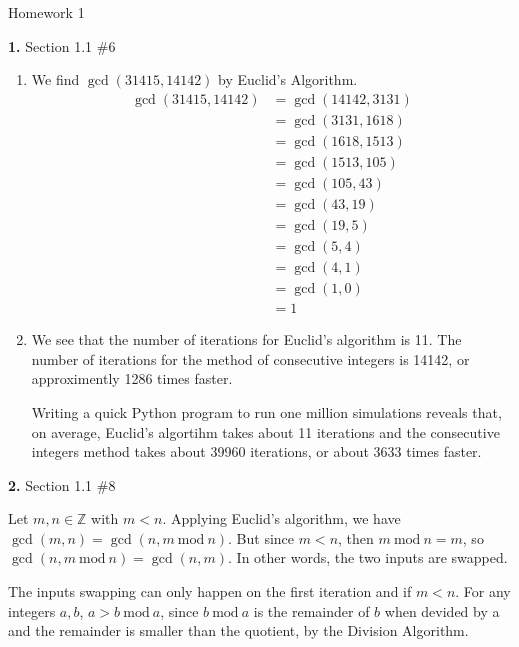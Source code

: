 \documentclass[letterpaper, 11pt]{article}
\newcommand{\Z}{\mathbb{Z}}
\newcommand{\hwnumber}[3]{\medskip \noindent\textbf{#1.} Section #2 \##3 \smallskip}
\newcommand{\Mod}[1]{\ \mathrm{mod}\ #1}
\begin{document}
\begin{center}
	{\LARGE Homework 1}\\
\end{center}

\hwnumber{1}{1.1}{6}

\begin{enumerate}[label = (\alph*)]
  \item We find $\gcd(31415, 14142)$ by Euclid's Algorithm.
    \begin{align*}
      \gcd(31415, 14142) &= \gcd(14142, 3131)\\
                         &= \gcd(3131, 1618)\\
                         &= \gcd(1618, 1513)\\
                         &= \gcd(1513, 105)\\
                         &= \gcd(105, 43)\\
                         &= \gcd(43, 19)\\
                         &= \gcd(19, 5)\\
                         &= \gcd(5, 4)\\
                         &= \gcd(4, 1)\\
                         &= \gcd(1, 0)\\
                         &= 1
    \end{align*}

  \item We see that the number of iterations for Euclid's algorithm is 11. The
    number of iterations for the method of consecutive integers is 14142, or
    approximently 1286 times faster. 

    Writing a quick Python program to run one million simulations reveals that,
    on average, Euclid's algortihm takes about 11 iterations and the consecutive
    integers method takes about 39960 iterations, or about 3633 times faster.
\end{enumerate}

\hwnumber{2}{1.1}{8}

Let $m, n \in \Z$ with $m < n$. Applying Euclid's algorithm, we have $\gcd(m, n)
= \gcd(n, m \Mod{n})$. But since $m < n$, then $m \Mod{n} = m$, so $\gcd(n, m
\Mod{n}) = \gcd(n, m)$. In other words, the two inputs are swapped. 

The inputs swapping can only happen on the first iteration and if $m < n$. For
any integers $a, b$, $a > b \Mod{a}$, since $b \Mod{a}$ is the
remainder of $b$ when devided by a and the remainder is smaller than the
quotient, by the Division Algorithm. 
\end{document}
